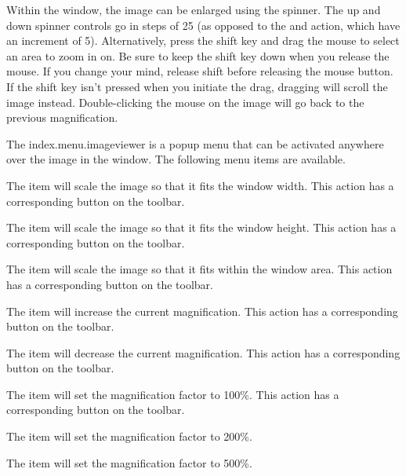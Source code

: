 Within the  window, the image can be enlarged
using the  spinner. The up and down
spinner controls go in steps of 25 (as opposed to the
 and 
action, which have an increment of 5). Alternatively, press the
shift key  and drag the mouse to select an area to
zoom in on. Be sure to keep the shift key down when you release the
mouse. If you change your mind, release shift before releasing the
mouse button. If the shift key isn't pressed when you initiate the
drag, dragging will scroll the image instead. Double-clicking the
mouse on the image will go back to the previous magnification.


The \gls{index.menu.imageviewer} is a popup menu that can
be activated anywhere over the image in the 
window. The following menu items are available.


The  item will scale the image so
that it fits the window width. This action has a corresponding
button on the toolbar.


The  item will scale the image so
that it fits the window height. This action has a corresponding
button on the toolbar.


The  item will scale the image so
that it fits within the window area. This action has a corresponding
button on the toolbar.


The  item will increase the current
magnification. This action has a corresponding
button on the toolbar.


The  item will decrease the current
magnification. This action has a corresponding
button on the toolbar.


The  item will set the magnification factor to
100\%. This action has a corresponding
button on the toolbar.


The  item will set the magnification factor to
200\%.


The  item will set the magnification factor to
500\%.

